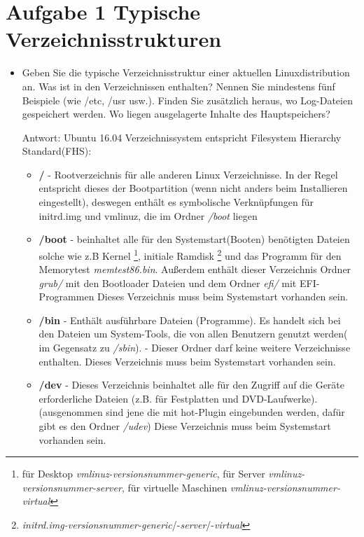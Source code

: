 \section{Aufgabe 1 Typische Verzeichnisstrukturen}
	\begin{itemize}
		\item Geben Sie die typische Verzeichnisstruktur einer aktuellen Linuxdistribution an. Was ist
		in den Verzeichnissen enthalten? Nennen Sie mindestens fünf Beispiele (wie /etc, /usr
		usw.). Finden Sie zusätzlich heraus, wo Log-Dateien gespeichert werden.
		Wo liegen ausgelagerte Inhalte des Hauptspeichers?

		Antwort: Ubuntu 16.04 Verzeichnissystem entspricht Filesystem Hierarchy Standard(FHS):

		\begin{itemize}
			\item \textbf{/} - Rootverzeichnis für alle anderen Linux Verzeichnisse.
			 In der Regel entspricht dieses der Bootpartition (wenn nicht anders beim Installieren eingestellt),
			 deswegen enthält es symbolische Verknüpfungen für initrd.img und vmlinuz,
			 die im Ordner \textit{/boot} liegen
			 \item \textbf{/boot} - beinhaltet alle für den Systemstart(Booten) benötigten Dateien
			 solche wie z.B Kernel \footnote{
			 für Desktop \textit{vmlinuz-versionsnummer-generic},
			 für Server \textit{vmlinuz-versionsnummer-server},
			 für virtuelle Maschinen \textit{vmlinuz-versionsnummer-virtual}
			 }, initiale Ramdisk \footnote{
			 \textit{initrd.img-versionsnummer-generic}/-\textit{server}/-\textit{virtual}}
			 und das Programm für den Memorytest \textit{memtest86.bin}.
			 Außerdem enthält dieser Verzeichnis Ordner \textit{grub/} mit den Bootloader Dateien
			 und dem Ordner \textit{efi/} mit EFI-Programmen
			 Dieses Verzeichnis muss beim Systemstart vorhanden sein.
			\item \textbf{/bin} - Enthält ausführbare Dateien (Programme).
			Es handelt sich bei den Dateien um System-Tools, die von allen Benutzern
			genutzt werden( im Gegensatz zu \textit{/sbin}). - Dieser Ordner darf keine
			weitere Verzeichnisse enthalten. Dieses Verzeichnis muss beim Systemstart vorhanden sein.
			\item \textbf{/dev} - Dieses Verzeichnis beinhaltet alle für den Zugriff
			auf die Geräte erforderliche Dateien (z.B. für  Festplatten und DVD-Laufwerke).
			(ausgenommen sind jene die mit hot-Plugin eingebunden werden, dafür gibt es den Ordner \textit{/udev})
			Diese Verzeichnis muss beim Systemstart vorhanden sein.

\end{itemize}
\end{itemize}
